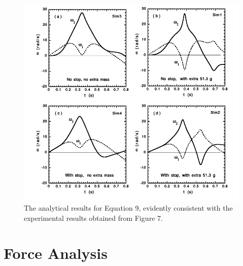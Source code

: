 \documentclass[%
 aip,
 amsmath,amssymb,
 reprint,%
 floatfix,%
]{revtex4-1}
\begin{document}
\begin{figure}[H]
	\centering
	\includegraphics[scale=0.25]{analyticalresults.png}
	\caption{The analytical results for Equation 9, evidently consistent with the experimental results obtained from Figure 7.}
\end{figure}

\section{\label{sec:level4}Force Analysis}
\end{document}
